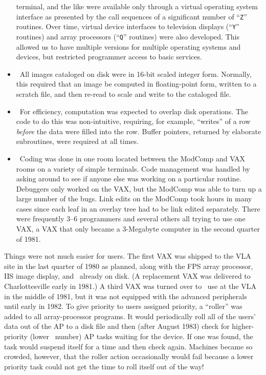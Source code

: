 \begin{itemize}
terminal, and the like were available only through a virtual operating
system interface as presented by the call sequences of a significant
number of ``{\tt Z}'' routines.  Over time, virtual device interfaces
to television displays (``{\tt Y}'' routines) and array processors
(``{\tt Q}'' routines) were also developed.  This allowed us to have
multiple versions for multiple operating systems and devices, but
restricted programmer access to basic services.
\item\ All images cataloged on disk were in 16-bit scaled integer form.
Normally, this required that an image be computed in floating-point
form, written to a scratch file, and then re-read to scale and write
to the cataloged file.
\item\ For efficiency, computation was expected to overlap disk
operations.  The code to do this was non-intuitive, requiring, for
example, ``writes'' of a row {\it before} the data were filled into
the row.  Buffer pointers, returned by elaborate subroutines, were
required at all times.
\item\ Coding was done in one room located between the ModComp and VAX
rooms on a variety of simple terminals.  Code management was handled
by asking around to see if anyone else was working on a particular
routine.  Debuggers only worked on the VAX, but the ModComp was able
to turn up a large number of the bugs.  Link edits on the ModComp took
hours in many cases since each leaf in an overlay tree had to be link
edited separately.  There were frequently 3--6 programmers and several
others all trying to use one VAX, a VAX that only became a 3-Megabyte
computer in the second quarter of 1981.
\end{itemize}

Things were not much easier for users.  The first VAX was shipped to
the VLA site in the last quarter of 1980 as planned, along with the
FPS array processor, IIS image display, and \RANCID\ already on disk.
(A replacement VAX was delivered to Charlottesville early in 1981.)
A third VAX was turned over to \AIPS\ use at the VLA in the middle of
1981, but it was not equipped with the advanced peripherals until
early in 1982.  To give priority to users assigned priority, a
``roller'' was added to all array-processor programs.  It would
periodically roll all of the users' data out of the AP to a disk file
and then (after August 1983) check for higher-priority (lower \AIPS\
number) AP tasks waiting for the device.  If one was found, the task
would suspend itself for a time and then check again.  Machines became
so crowded, however, that the roller action occasionally would fail
because a lower priority task could not get the time to roll itself
out of the way!

